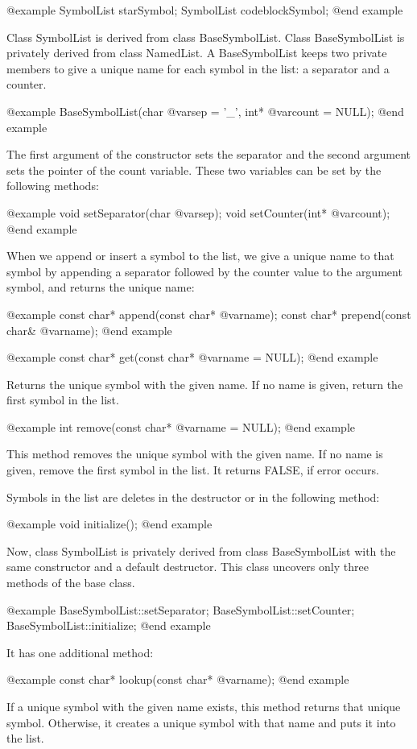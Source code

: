 @example
SymbolList starSymbol;
SymbolList codeblockSymbol;
@end example

Class SymbolList is derived from class BaseSymbolList. Class BaseSymbolList
is privately derived from class NamedList.
A BaseSymbolList keeps two private  members to give a unique name for 
each symbol in the list: a separator and a counter.

@example
BaseSymbolList(char @var{sep} = '_', int* @var{count} = NULL);
@end example

The first argument of the constructor sets the separator and the second 
argument sets the pointer of the count variable. These two variables can be
set by the following methods:

@example
void setSeparator(char @var{sep});
void setCounter(int* @var{count});
@end example

When we append or insert a symbol to the list, we give a unique 
name to that symbol by appending a separator followed by the counter value
to the argument symbol, and returns the unique name:

@example
const char* append(const char* @var{name});
const char* prepend(const char& @var{name});
@end example

@example
const char* get(const char* @var{name} = NULL);
@end example

Returns the unique symbol with the given name. If no name is given, return the
first symbol in the list.

@example
int remove(const char* @var{name} = NULL);
@end example

This method removes the unique symbol with the given name. If no name is given,
remove the first symbol in the list. It returns FALSE, if error occurs.

Symbols in the list are deletes in the destructor or in the following method:

@example
void initialize();
@end example

Now, class SymbolList is privately derived from class BaseSymbolList with
the same constructor and a default destructor.
This class uncovers only three methods of the base class.

@example
BaseSymbolList::setSeparator;
BaseSymbolList::setCounter;
BaseSymbolList::initialize;
@end example

It has one additional method:

@example
const char* lookup(const char* @var{name});
@end example

If a unique symbol with the given name exists, this method returns that
unique symbol. Otherwise, it creates a unique symbol with that name and 
puts it into the list.

